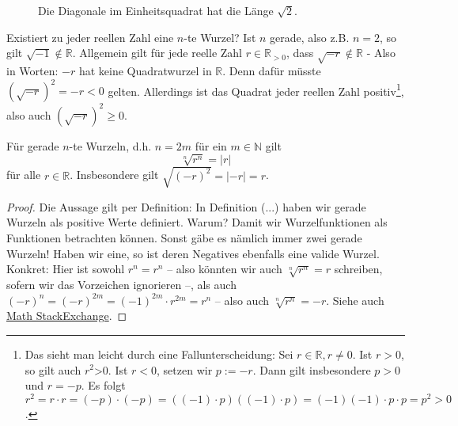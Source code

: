 \begin{figure}
    \begin{center}
    \end{center}
    \caption[short]{Die Diagonale im Einheitsquadrat hat die Länge \(\sqrt{2}\).}
\end{figure}

Existiert zu jeder reellen Zahl eine \(n\)-te Wurzel? Ist \(n\) gerade, also z.B. \(n=2\), so gilt \(\sqrt{-1} \notin \mathbb R\). Allgemein gilt für jede reelle Zahl \(r \in \mathbb R_{>0}\), dass \(\sqrt{-r}\notin \mathbb R\) - Also in Worten: \(-r\) hat keine Quadratwurzel in \(\mathbb R\). Denn dafür müsste \((\sqrt{-r})^2 = -r <0\) gelten. Allerdings ist das Quadrat jeder reellen Zahl positiv\footnote{Das sieht man leicht durch eine Fallunterscheidung: Sei \(r \in \mathbb R, r \neq 0\). Ist \(r>0\), so gilt auch \(r^2\)>0. Ist \(r<0\), setzen wir \(p := -r\). Dann gilt insbesondere \(p>0\) und \(r = -p\). Es folgt \(r^2 = r\cdot r = (-p)\cdot (-p) = ((-1)\cdot p)((-1)\cdot p) = (-1)(-1)\cdot p\cdot p = p^2>0\).}, also auch \((\sqrt{-r})^2 \geq 0\). 

\begin{proposition}
    Für gerade \(n\)-te Wurzeln, d.h. \(n = 2m\) für ein \(m \in \mathbb N\) gilt 
    \begin{equation*}
        \sqrt[n]{r^n} = |r|
    \end{equation*}
    für alle \(r \in \mathbb R\). Insbesondere gilt \(\sqrt{(-r)^2}=|-r| = r\).
\end{proposition}
\begin{proof}
    Die Aussage gilt per Definition: In Definition (...) haben wir gerade Wurzeln als positive Werte definiert. Warum? Damit wir Wurzelfunktionen als Funktionen betrachten können. Sonst gäbe es nämlich immer zwei gerade Wurzeln! Haben wir eine, so ist deren Negatives ebenfalls eine valide Wurzel. Konkret: Hier ist sowohl \(r^n = r^n\) -- also könnten wir auch \(\sqrt[n]{r^n} = r\) schreiben, sofern wir das Vorzeichen ignorieren --, als auch \((-r)^n = (-r)^{2m} = (-1)^{2m}\cdot r^{2m} = r^{n}\) -- also auch \(\sqrt[n]{r^n} = -r\). Siehe auch \href{https://math.stackexchange.com/a/258880}{Math StackExchange}.
\end{proof}

